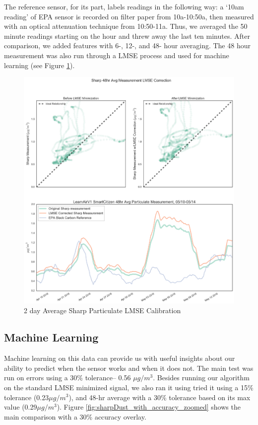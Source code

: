 The reference sensor, for its part, labels readings in the following way: a `10am reading' of EPA sensor is recorded on filter paper from 10a-10:50a, then measured with an optical attenuation technique from 10:50-11a.  Thus, we averaged the 50 minute readings starting on the hour and threw away the last ten minutes.  After comparison, we added features with 6-, 12-, and 48- hour averaging.  The 48 hour measurement was also run through a LMSE process and used for machine learning (see Figure \ref{fig:sharpDust_avg_48_lmse}).

\begin{figure}[htb]
 	\includegraphics[width=\textwidth]{figs/sharpDust_avg_48_lmse}               
 	 \caption{2 day Average Sharp Particulate LMSE Calibration}
  	\label{fig:sharpDust_avg_48_lmse}
\end{figure}


\subsection{Machine Learning}

Machine learning on this data can provide us with useful insights about our ability to predict when the sensor works and when it does not.  The main test was run on errors using a 30\% tolerance-- 0.56 $\mu g/m^3$. Besides running our algorithm on the standard LMSE minimized signal, we also ran it using tried it using a 15\% tolerance (0.23$\mu g/m^3$), and 48-hr average with a 30\% tolerance based on its max value (0.29$\mu g/m^3$).  Figure \ref{fig:sharpDust_with_accuracy_zoomed} shows the main comparison with a 30\% accuracy overlay. 

